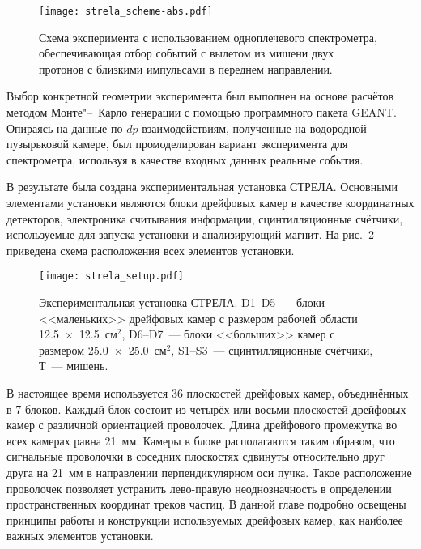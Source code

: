 \begin{figure}[h]
  \centering
  \vspace{2ex}
  \texttt{[image: strela\_scheme-abs.pdf]}
  \caption{Схема эксперимента с использованием одноплечевого спектрометра,
    обеспечивающая отбор событий с вылетом из мишени двух протонов с близкими
    импульсами в переднем направлении.}
  \label{fig:strela_scheme}
\end{figure}

Выбор конкретной геометрии эксперимента был выполнен на основе расчётов методом
Монте"--~Карло генерации с помощью программного пакета GEANT. Опираясь на данные
по $dp$-взаимодействиям, полученные на водородной пузырьковой камере, был
промоделирован вариант эксперимента для спектрометра, используя в качестве
входных данных реальные события.

В результате была создана экспериментальная установка СТРЕЛА. Основными
элементами установки являются блоки дрейфовых камер в качестве координатных
детекторов, электроника считывания информации, сцинтилляционные счётчики,
используемые для запуска установки и анализирующий магнит. На
рис.~\ref{fig:strela_setup} приведена схема расположения всех элементов
установки.

\begin{figure}[h]
  \centering
  \vspace{-6ex}
  \texttt{[image: strela\_setup.pdf]}
  \vspace{-2ex}
  \caption{Экспериментальная установка СТРЕЛА. D1--D5~--- блоки <<маленьких>>
    дрейфовых камер с размером рабочей области 12.5~$\times$~12.5~см$^2$,
    D6--D7~--- блоки <<больших>> камер с размером 25.0~$\times$~25.0~см$^2$,
    S1--S3~--- сцинтилляционные счётчики,  Т~--- мишень.}
  \label{fig:strela_setup}
\end{figure}

В настоящее время используется 36 плоскостей дрейфовых камер, объединённых в 7
блоков. Каждый блок состоит из четырёх или восьми плоскостей дрейфовых камер с
различной ориентацией проволочек. Длина дрейфового промежутка во всех камерах
равна 21~мм. Камеры в блоке располагаются таким образом, что сигнальные
проволочки в соседних плоскостях сдвинуты относительно друг друга на 21~мм в
направлении перпендикулярном оси пучка. Такое расположение проволочек позволяет
устранить лево-правую неоднозначность в определении пространственных координат
треков частиц. В данной главе подробно освещены принципы работы и конструкции
используемых дрейфовых камер, как наиболее важных элементов установки.

